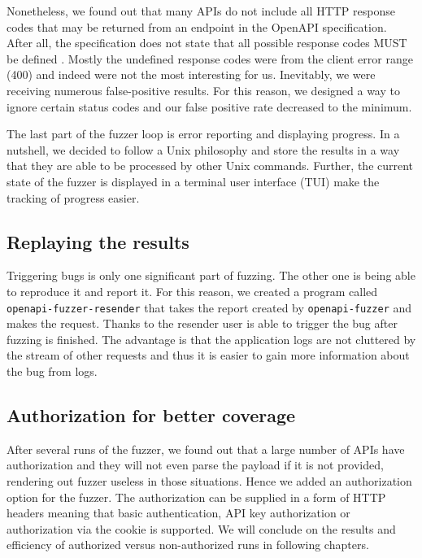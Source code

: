 Nonetheless, we found out that many APIs do not include all HTTP response codes that may be returned from an endpoint in the OpenAPI specification. After all, the specification does not state that all possible response codes MUST be defined \cite{openapi2020github}. Mostly the undefined response codes were from the client error range (400) and indeed were not the most interesting for us. Inevitably, we were receiving numerous false-positive results. For this reason, we designed a way to ignore certain status codes and our false positive rate decreased to the minimum.

The last part of the fuzzer loop is error reporting and displaying progress. In a nutshell, we decided to follow a Unix philosophy and store the results in a way that they are able to be processed by other Unix commands. Further, the current state of the fuzzer is displayed in a terminal user interface (TUI) make the tracking of progress easier.

\subsection{Replaying the results}
Triggering bugs is only one significant part of fuzzing. The other one is being able to reproduce it and report it. For this reason, we created a program called \newline \texttt{openapi-fuzzer-resender} that takes the report created by \texttt{openapi-fuzzer} and makes the request. Thanks to the resender user is able to trigger the bug after fuzzing is finished. The advantage is that the application logs are not cluttered by the stream of other requests and thus it is easier to gain more information about the bug from logs.

\subsection{Authorization for better coverage}
After several runs of the fuzzer, we found out that a large number of APIs have authorization and they will not even parse the payload if it is not provided, rendering out fuzzer useless in those situations. Hence we added an authorization option for the fuzzer. The authorization can be supplied in a form of HTTP headers meaning that basic authentication, API key authorization or authorization via the cookie is supported. We will conclude on the results and efficiency of authorized versus non-authorized runs in following chapters.
